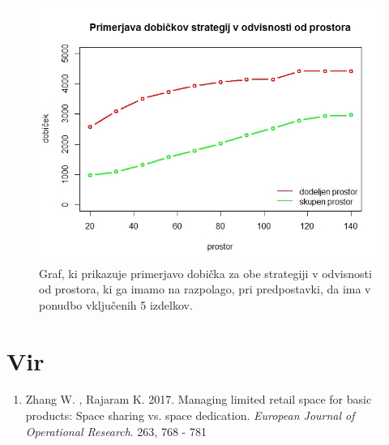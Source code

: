 \documentclass[a4paper]{article}
\begin{document}
\begin{figure}[ht]
\includegraphics [scale = 0.6]{primerjava-strategij-kolicina-prostora}
\caption{Graf, ki prikazuje primerjavo dobička za obe strategiji v odvisnosti od prostora, ki ga imamo na razpolago, pri predpostavki, da ima v ponudbo vključenih 5 izdelkov.}
\end{figure}



\section{Vir}

\begin{enumerate}
\item Zhang W. , Rajaram K. 2017. Managing limited retail space for basic products: Space sharing vs. space dedication. \textit{European Journal of Operational Research}. 263, 768 - 781
\end{enumerate}
\end{document}
